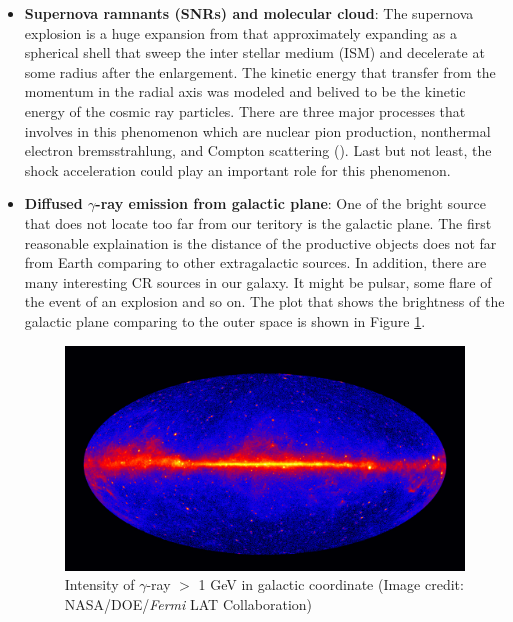 \begin{itemize}
    \item \textbf{Supernova ramnants (SNRs) and molecular cloud}: 
    The supernova explosion is a huge expansion from that approximately
    expanding as a spherical shell that sweep the inter stellar medium (ISM)
    and decelerate at some radius after the enlargement. The kinetic 
    energy that transfer from the momentum in the radial axis was 
    modeled and belived to be the kinetic energy of the cosmic ray particles.
    There are three major processes that involves in this phenomenon which 
    are nuclear pion production, nonthermal electron bremsstrahlung, and Compton scattering
    (\cite{cr_from_snr_2013}). Last but not least, the shock acceleration
    could play an important role for this phenomenon.

    \item \textbf{Diffused $\gamma$-ray emission from galactic plane}:
    One of the bright source that does not locate too far from our teritory
    is the galactic plane. The first reasonable explaination is the 
    distance of the productive objects does not far from Earth comparing 
    to other extragalactic sources. In addition, there are many interesting 
    CR sources in our galaxy. It might be pulsar, some flare of the 
    event of an explosion and so on. The plot that shows the brightness
    of the galactic plane comparing to the outer space is shown in 
    Figure \ref{fig:gamma_galac_plane}.

    \begin{figure}[h!]
        \centering
        \includegraphics[width=\textwidth]{content/background/figures/Fermi_5_years.jpg}
        \caption{Intensity of $\gamma$-ray $>$ 1 GeV in galactic coordinate (Image credit: NASA/DOE/\textit{Fermi} LAT Collaboration)}
        \label{fig:gamma_galac_plane}
    \end{figure}


\end{itemize}
